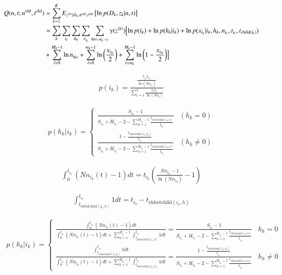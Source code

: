 \documentclass[10pt]{jsarticle}
\begin{document}
\begin{align}
 Q(n,t; n^{\mathrm{old}},t^{\mathrm{old}}) &= \sum_{k=1}^{K} E_{z^{(k)} | D_k, n^{\mathrm{old}}, t^{\mathrm{old}}} \left[ \ln p(D_k ,z_k | n, t)\right]\\
 & = \sum_{k}\sum_{i_k}\sum_{h_k}\sum_{x_{i_k}} \sum_{q_{k0:(M_k-1)}} \gamma(z^{(k)})\Bigl[\ln p(i_k) + \ln p(h_k | i_k) + \ln p(x_{i_k} | i_k, h_k, n_{i_k}, t_{i_k}, t_{\mathrm{child}(i_k)})\\
 & + \sum_{l=0}^{M_k - 1} \ln n_{q_{kl}} + \sum_{l=0}^{m_k - 1} \ln \left(\frac{x_{i_{kl}}}{2}\right) + \sum_{l=m_k}^{M_k -1} \ln \left(1 - \frac{x_{i_{kl}}}{2}\right) \Bigr]
\end{align}

\begin{align}
 p(i_k) = \frac{\frac{t_{i_k}n_{i_k}}{\ln \left(N n_{i_k} \right)}}{\sum_{i=1}^{I}\frac{t_{i}n_{i}}{\ln \left(N n_{i} \right)}}
\end{align}

\begin{align}
 p(h_k | i_k) =
 \begin{cases}
  \frac{S_{i_k} - 1}{S_{i_k} + H_{i_k} - 2 - \sum_{h=1}^{H_{i_k} - 1} \frac{t_{\mathrm{eldestchild}(i_k, h)}}{t_{i_k}}} & (h_k = 0)\\
  \frac{1 - \frac{t_{\mathrm{eldestchild}(i_k, h_k)}}{t_{i_k}}}{S_{i_k} + H_{i_k} - 2 - \sum_{h=1}^{H_{i_k} - 1} \frac{t_{\mathrm{eldestchild}(i_k, h)}}{t_{i_k}}} & (h_k \neq 0)
 \end{cases}
\end{align}

\begin{align}
 \int_{0}^{t_{i_k}} \left(Nn_{i_k}(t) - 1\right) dt = t_{i_k} \left(\frac{Nn_{i_k} - 1}{\ln \left( Nn_{i_k} \right)} - 1\right)
\end{align}

\begin{align}
 \int_{t_{\mathrm{eldestchild}(i_k, h)}}^{t_{i_k}} 1 dt = t_{i_k} - t_{\mathrm{eldestchild}(i_k, h)}
\end{align}

\begin{align}
 p(h_k | i_k) =
 \begin{cases}
  \frac{\int_{0}^{t_{i_k}} \left(Nn_{i_k}(t) - 1\right) dt}{\int_{0}^{t_{i_k}} \left(Nn_{i_k}(t) - 1\right) dt + \sum_{h=1}^{H_{i_k} - 1}\int_{t_{\mathrm{eldestchild}(i_k, h)}}^{t_{i_k}} 1 dt} =  \frac{S_{i_k} - 1}{S_{i_k} + H_{i_k} - 2 - \sum_{h=1}^{H_{i_k} - 1} \frac{t_{\mathrm{eldestchild}(i_k, h)}}{t_{i_k}}} & h_k=0\\
  \frac{\int_{t_{\mathrm{eldestchild}(i_k, h_k)}}^{t_{i_k}} 1 dt}{\int_{0}^{t_{i_k}} \left(Nn_{i_k}(t) - 1\right) dt + \sum_{h=1}^{H_{i_k} - 1}\int_{t_{\mathrm{eldestchild}(i_k, h)}}^{t_{i_k}} 1 dt} = \frac{1 - \frac{t_{\mathrm{eldestchild}(i_k, h_k)}}{t_{i_k}}}{S_{i_k} + H_{i_k} - 2 - \sum_{h=1}^{H_{i_k} - 1} \frac{t_{\mathrm{eldestchild}(i_k, h)}}{t_{i_k}}} & h_k \neq 0
 \end{cases}
\end{align}
\end{document}
